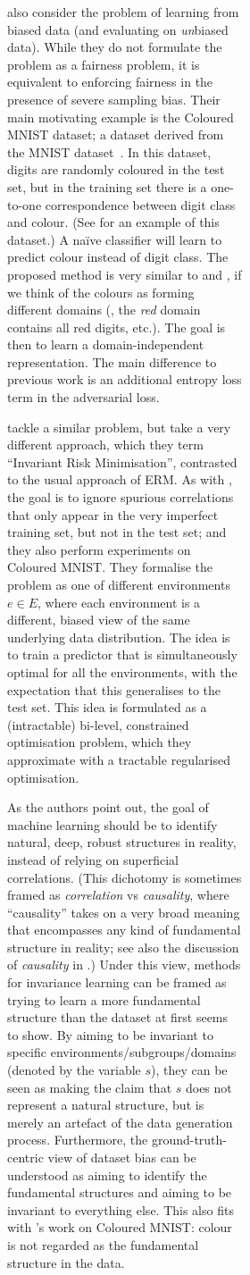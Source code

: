 \begin{figure}[tp]
\begin{subfigure}[b]{0.4\textwidth}
\begin{subfigure}[b]{0.4\textwidth}
\citet{kim2019learning} also consider the problem of learning from biased data (and evaluating on
\emph{un}biased data). While they do not formulate the problem as a fairness problem, it is
equivalent to enforcing fairness in the presence of severe sampling bias. Their main motivating
example is the Coloured MNIST dataset; a dataset derived from the MNIST
dataset~\citep{lecun1994mnist}. In this dataset, digits are randomly coloured in the test set, but
in the training set there is a one-to-one correspondence between digit class and colour. (See
 for an example of this dataset.) A na\"ive classifier will learn to
predict colour instead of digit class. The proposed method is very similar to
\citet{ganin2016domain} and \citet{edwards2016censoring}, if we think of the colours as forming
different domains (\ie, the \emph{red} domain contains all red digits, etc.). The goal is then to
learn a domain-independent representation. The main difference to previous work is an additional
entropy loss term in the adversarial loss.

\citet{arjovsky2019invariant} tackle a similar problem, but take a very different approach, which
they term ``Invariant Risk Minimisation'', contrasted to the usual approach of \acf{ERM}. As with
\citet{kim2019learning}, the goal is to ignore spurious correlations that only appear in the very
imperfect training set, but not in the test set; and they also perform experiments on Coloured
MNIST. They formalise the problem as one of different environments $e\in E$, where each environment
is a different, biased view of the same underlying data distribution. The idea is to train a
predictor that is simultaneously optimal for all the environments, with the expectation that this
generalises to the test set. This idea is formulated as a (intractable) bi-level, constrained
optimisation problem, which they approximate with a tractable regularised optimisation.

As the authors point out, the goal of machine learning should be to identify natural, deep, robust
structures in reality, instead of relying on superficial correlations. (This dichotomy is sometimes
framed as \emph{correlation} vs \emph{causality}, where ``causality'' takes on a very broad meaning
that encompasses any kind of fundamental structure in reality; see also the discussion of
\emph{causality} in .) Under this view, methods for invariance learning
can be framed as trying to learn a more fundamental structure than the dataset at first seems to
show. By aiming to be invariant to specific environments/subgroups/domains (denoted by the variable
\(s\)), they can be seen as making the claim that \(s\) does not represent a natural structure, but
is merely an artefact of the data generation process. Furthermore, the ground-truth-centric view of
dataset bias can be understood as aiming to identify the fundamental structures and aiming to be
invariant to everything else. This also fits with \citet{kim2019learning}'s work on Coloured MNIST:
colour is not regarded as the fundamental structure in the data.


\end{subfigure}
\end{subfigure}
\end{figure}
